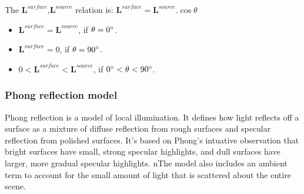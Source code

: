 \documentclass{article}
\begin{document}
	The  $\pmb{L}^{surface}$,$ \pmb{L}^{source}$ relation is: $\pmb{L}^{surface} = \pmb{L}^{source}.\cos \theta $
	\begin{itemize}
		\item $\pmb{L}^{surface} = \pmb{L}^{source}$, if $\theta = 0\degree$.
		\item $\pmb{L}^{surface} = 0$, if $\theta = 90\degree$.
		\item $0 < \pmb{L}^{surface} < \pmb{L}^{source}$, if $0\degree < \theta  < 90\degree$.
	\end{itemize}
	
	\subsubsection{Phong reflection model }
	Phong reflection is a model of local illumination. It defines how light reflects off a surface as a mixture of diffuse reflection from rough surfaces and specular reflection from polished surfaces. It's based on Phong's intuative observation that bright surfaces have small, strong specular highlights, and dull surfaces have larger, more gradual specular highlights. nThe model also includes an ambient term to account for the small amount of light that is scattered about the entire scene.
	\\
	
\end{document}
